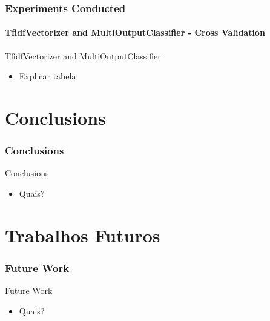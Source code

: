 \begin{frame}
	\frametitle{Experiments Conducted}
	\framesubtitle{TfidfVectorizer and MultiOutputClassifier - Cross Validation}
	
	\begin{table}
		\centering
		\resizebox{1\textwidth}{!}{
			
		}
		\caption{TfidfVectorizer and MultiOutputClassifier - Cross Validation}
	\end{table}

	\begin{exampleblock}{TfidfVectorizer and MultiOutputClassifier} 
		\begin{itemize}
			\item Explicar tabela
		\end{itemize}
	\end{exampleblock}
\end{frame}
\section{Conclusions}
\begin{frame}
	\frametitle{Conclusions}

	\begin{block}{Conclusions} 
		\begin{itemize}
			\item Quais?
		\end{itemize}
	\end{block}



\end{frame}
\section{Trabalhos Futuros}
\begin{frame}
	\frametitle{Future Work}
	\begin{block}{Future Work} 
		\begin{itemize}
			\item Quais?
		\end{itemize}
	\end{block}
\end{frame}


















